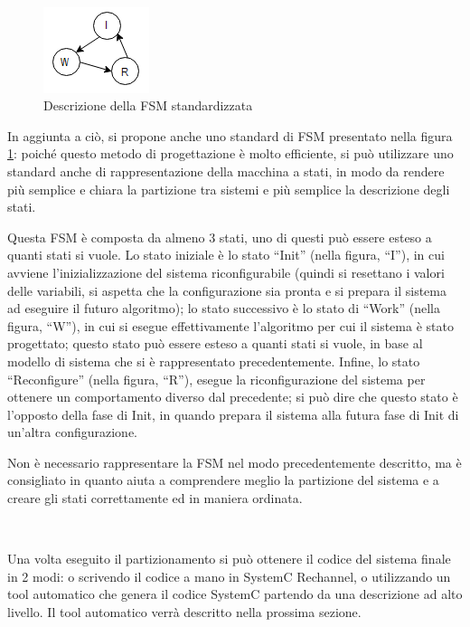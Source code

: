 \documentclass[a4paper,titlepage]{book}
\begin{document}
~ 

\begin{figure}[!ht]
\centering
\includegraphics[scale=1.5]{fsm.png}
\caption{Descrizione della FSM standardizzata}\label{fig:8}
\end{figure}

In aggiunta a ciò, si propone anche uno standard di FSM presentato nella figura \ref{fig:8}: poiché questo metodo di progettazione è molto efficiente, si può utilizzare uno standard anche di rappresentazione della macchina a stati, in modo da rendere più semplice e chiara la partizione tra sistemi e più semplice la descrizione degli stati.

Questa FSM è composta da almeno 3 stati, uno di questi può essere esteso a quanti stati si vuole. Lo stato iniziale è lo stato ``Init'' (nella figura, ``I''), in cui avviene l'inizializzazione del sistema riconfigurabile (quindi si resettano i valori delle variabili, si aspetta che la configurazione sia pronta e si prepara il sistema ad eseguire il futuro algoritmo); lo stato successivo è lo stato di ``Work'' (nella figura, ``W''), in cui si esegue effettivamente l'algoritmo per cui il sistema è stato progettato; questo stato può essere esteso a quanti stati si vuole, in base al modello di sistema che si è rappresentato precedentemente. Infine, lo stato ``Reconfigure'' (nella figura, ``R''), esegue la riconfigurazione del sistema per ottenere un comportamento diverso dal precedente; si può dire che questo stato è l'opposto della fase di Init, in quando prepara il sistema alla futura fase di Init di un'altra configurazione.

Non è necessario rappresentare la FSM nel modo precedentemente descritto, ma è consigliato in quanto aiuta a comprendere meglio la partizione del sistema e a creare gli stati correttamente ed in maniera ordinata.

~ 

Una volta eseguito il partizionamento si può ottenere il codice del sistema finale in 2 modi: o scrivendo il codice a mano in SystemC Rechannel, o utilizzando un tool automatico che genera il codice SystemC partendo da una descrizione ad alto livello. Il tool automatico verrà descritto nella prossima sezione.
\end{document}
